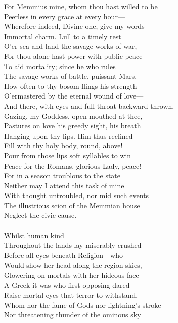 For Memmius mine, whom thou hast willed to be\\
Peerless in every grace at every hour—\\
Wherefore indeed, Divine one, give my words\\
Immortal charm. Lull to a timely rest\\
O'er sea and land the savage works of war,\\
For thou alone hast power with public peace\\
To aid mortality; since he who rules\\
The savage works of battle, puissant Mars,\\
How often to thy bosom flings his strength\\
O'ermastered by the eternal wound of love—\\
And there, with eyes and full throat backward thrown,\\
Gazing, my Goddess, open-mouthed at thee,\\
Pastures on love his greedy sight, his breath\\
Hanging upon thy lips. Him thus reclined\\
Fill with thy holy body, round, above!\\
Pour from those lips soft syllables to win\\
Peace for the Romans, glorious Lady, peace!\\
For in a season troublous to the state\\
Neither may I attend this task of mine\\
With thought untroubled, nor mid such events\\
The illustrious scion of the Memmian house\\
Neglect the civic cause.\\
\\
Whilst human kind\\
Throughout the lands lay miserably crushed\\
Before all eyes beneath Religion—who\\
Would show her head along the region skies,\\
Glowering on mortals with her hideous face—\\
A Greek it was who first opposing dared\\
Raise mortal eyes that terror to withstand,\\
Whom nor the fame of Gods nor lightning's stroke\\
Nor threatening thunder of the ominous sky\\
